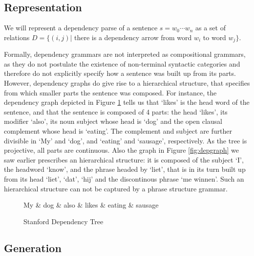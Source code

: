 \documentclass[hidelinks]{report}
\begin{document}
\subsection{Representation}

We will represent a dependency parse of a sentence $s = w_0\cdots w_n$ as a set of relations $D = \{(i,j)|$ there is a dependency arrow from word $w_i$ to word $w_j \}$. 

Formally, dependency grammars are not interpreted as compositional grammars, as they do not postulate the existence of non-terminal syntactic categories and therefore do not explicitly specify how a sentence was built up from its parts. However, dependency graphs do give rise to a hierarchical structure, that specifies from which smaller parts the sentence was composed. For instance, the dependency graph depicted in Figure \ref{fig:deptree} tells us that `likes' is the head word of the sentence, and that the sentence is composed of 4 parts: the head `likes', its modifier `also', its noun subject whose head is `dog' and the open clausal complement whose head is `eating'. The complement and subject are further divisible in `My' and `dog', and `eating' and `sausage', respectively. As the tree is projective, all parts are continuous. Also the graph in Figure \ref{fig:depgraph} we saw earlier prescribes an hierarchical structure: it is composed of the subject `I', the headword `know', and the phrase headed by `liet', that is in its turn built up from its head `liet', `dat', `hij' and the discontinous phrase `me winnen'. Such an hierarchical structure can not be captured by a phrase structure grammar.

\begin{figure}[!h]\label{fig:deptree1}
\centering
\begin{dependency}[theme=simple]%
\begin{deptext}[column sep=.5cm, row sep=.1ex]
My \& dog \& also \& likes \& eating \& sausage \\
\end{deptext}
\end{dependency}
\caption{Stanford Dependency Tree}\label{fig:deptree}
\end{figure}

\subsection{Generation}
\end{document}
